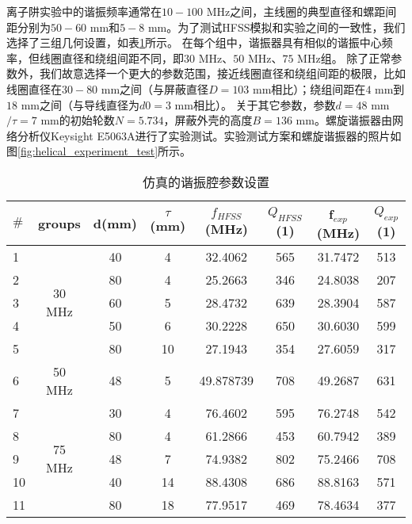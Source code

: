 离子阱实验中的谐振频率通常在$10-100$ MHz之间，主线圈的典型直径和螺距间距分别为$50-60 $ mm和$5-8$ mm。为了测试HFSS模拟和实验之间的一致性，我们选择了三组几何设置，如表\ref{tb:helical_simulation_parameters}所示。
在每个组中，谐振器具有相似的谐振中心频率，但线圈直径和绕组间距不同，即$30$ MHz、$50$ MHz、$75$ MHz组。
除了正常参数外，我们故意选择一个更大的参数范围，接近线圈直径和绕组间距的极限，比如线圈直径在$30-80$ mm之间（与屏蔽直径$D=103$ mm相比）；绕组间距在$4$ mm到$ 18$ mm之间（与导线直径为$d0 = 3$ mm相比）。
关于其它参数，参数$d=48$ mm$/\tau = 7$ mm的初始轮数$N = 5.734$，屏蔽外壳的高度$ B = 136$ mm。螺旋谐振器由网络分析仪Keysight E5063A进行了实验测试。实验测试方案和螺旋谐振器的照片如图\ref{fig:helical_experiment_test}所示。
\begin{table}
    \centering
    \caption[仿真的谐振腔参数设置]{仿真的谐振腔参数设置\label{tb:helical_simulation_parameters}}
    \begin{tabular}{lccccccc}
        \toprule
        $\#$ & groups & d(mm) & $\tau$(mm) & $f_{HFSS}$(MHz) & $Q_{HFSS}$(1) & f$_{exp}$(MHz) & $Q_{exp}$(1) \\
        \midrule

        1 & \multirow{5}{*}{30 MHz} 	& 40 & 4  & 32.4062 & 565 & 31.7472 & 513   \\
        2 & 						& 80 & 4  & 25.2663 & 346 & 24.8038 & 207   \\
        3 & 						& 60 & 5  & 28.4732 & 639 & 28.3904 & 587   \\
        4 & 						& 50 & 6  & 30.2228 & 650 & 30.6030 & 599   \\
        5 & 						& 80 & 10 & 27.1943 & 354 & 27.6059 & 317   \\
        \midrule
        6 & 50 MHz 					& 48 & 5  & 49.878739 & 708 & 49.2687 & 631   \\
        \midrule
        7 & \multirow{5}{*}{75 MHz} 	& 30 & 4  & 76.4602 & 595 & 76.2748 & 542   \\
        8 & 						& 80 & 4  & 61.2866 & 453 & 60.7942 & 389   \\
        9 & 						& 48 & 7  & 74.9382 & 802 & 75.2466 & 708   \\
        10 & 						& 40 & 14 & 88.4308 & 686 & 88.8163 & 571   \\
        11 & 						& 80 & 18 & 77.9517 & 469 & 78.4634 & 377   \\
        \bottomrule
    \end{tabular}
\end{table}


